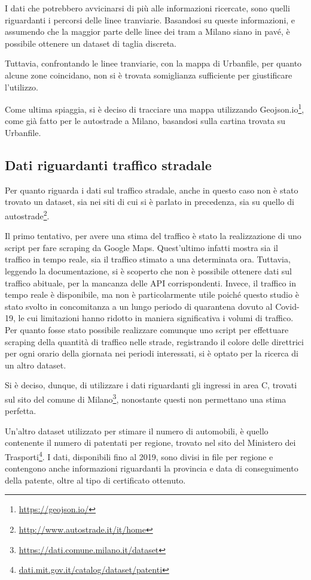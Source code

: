 \documentclass[a4paper,12pt]{report}
\begin{document}
I dati che potrebbero avvicinarsi di più alle informazioni ricercate, 
sono quelli riguardanti i percorsi delle linee tranviarie. 
Basandosi su queste informazioni, e assumendo che la maggior parte delle linee dei 
tram a Milano siano in pavé, è possibile ottenere un dataset di taglia discreta.

Tuttavia, confrontando le linee tranviarie, con la mappa di Urbanfile, 
per quanto alcune zone coincidano, non si è trovata 
somiglianza sufficiente per giustificare l'utilizzo.

Come ultima spiaggia, si è deciso di tracciare una mappa utilizzando 
Geojson.io\footnote{\url{https://geojson.io/}}, come già fatto per le autostrade a Milano, 
basandosi sulla cartina trovata su Urbanfile. 

\subsection{Dati riguardanti traffico stradale}

Per quanto riguarda i dati sul traffico stradale, anche in questo caso non è stato trovato un 
dataset, sia nei siti di cui si è parlato in precedenza, sia su quello di 
autostrade\footnote{\url{http://www.autostrade.it/it/home}}.

Il primo tentativo, per avere una stima del traffico è stato la realizzazione di uno 
script per fare scraping da Google Maps. 
Quest'ultimo infatti mostra sia il traffico in tempo reale, sia 
il traffico stimato a una determinata ora. 
Tuttavia, leggendo la documentazione, si è scoperto che non è possibile ottenere 
dati sul traffico abituale, per la mancanza delle API corrispondenti. 
Invece, il traffico in tempo reale è disponibile, ma non è particolarmente utile 
poiché questo studio è stato svolto in concomitanza a un lungo periodo di quarantena 
dovuto al Covid-19, le cui limitazioni hanno ridotto in maniera significativa 
i volumi di traffico.
Per quanto fosse stato possibile realizzare comunque uno script per effettuare 
scraping della quantità di traffico nelle strade, registrando il colore delle 
direttrici per ogni orario della giornata nei periodi interessati, si è 
optato per la ricerca di un altro dataset.

Si è deciso, dunque, di utilizzare i dati riguardanti gli ingressi in area C, 
trovati sul sito del comune di Milano\footnote{\url{https://dati.comune.milano.it/dataset}}, 
nonostante questi non permettano una stima perfetta.

Un'altro dataset utilizzato per stimare il numero di automobili, è quello contenente 
il numero di patentati per regione, trovato nel sito del Ministero dei 
Trasporti\footnote{\url{dati.mit.gov.it/catalog/dataset/patenti}}.
I dati, disponibili fino al 2019, sono divisi in file per regione e 
contengono anche informazioni riguardanti la provincia e data di conseguimento della 
patente, oltre al tipo di certificato ottenuto.
\end{document}
